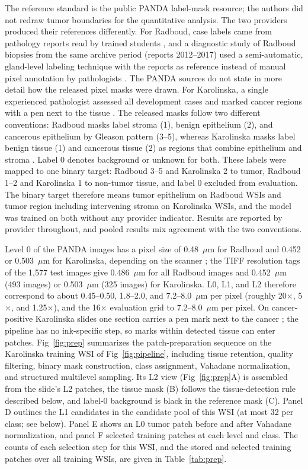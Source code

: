 \documentclass[10pt,letterpaper]{article}
\begin{document}
The reference standard is the public PANDA label-mask resource; the authors did not redraw tumor boundaries for the quantitative analysis. The two providers produced their references differently. For Radboud, case labels came from pathology reports read by trained students \cite{bibPANDAdesign}, and a diagnostic study of Radboud biopsies from the same archive period (reports 2012--2017) used a semi-automatic, gland-level labeling technique with the reports as reference instead of manual pixel annotation by pathologists \cite{bib10,bibBulten2019}. The PANDA sources do not state in more detail how the released pixel masks were drawn. For Karolinska, a single experienced pathologist assessed all development cases and marked cancer regions with a pen next to the tissue \cite{bibPANDAdesign}. The released masks follow two different conventions: Radboud masks label stroma (1), benign epithelium (2), and cancerous epithelium by Gleason pattern (3--5), whereas Karolinska masks label benign tissue (1) and cancerous tissue (2) as regions that combine epithelium and stroma \cite{bib11}. Label 0 denotes background or unknown for both. These labels were mapped to one binary target: Radboud 3--5 and Karolinska 2 to tumor, Radboud 1--2 and Karolinska 1 to non-tumor tissue, and label 0 excluded from evaluation. The binary target therefore means tumor epithelium on Radboud WSIs and tumor region including intervening stroma on Karolinska WSIs, and the model was trained on both without any provider indicator. Results are reported by provider throughout, and pooled results mix agreement with the two conventions.

Level 0 of the PANDA images has a pixel size of 0.48~$\mu$m for Radboud and 0.452 or 0.503~$\mu$m for Karolinska, depending on the scanner \cite{bibPANDAdesign}; the TIFF resolution tags of the 1,577 test images give 0.486~$\mu$m for all Radboud images and 0.452~$\mu$m (493 images) or 0.503~$\mu$m (325 images) for Karolinska. L0, L1, and L2 therefore correspond to about 0.45--0.50, 1.8--2.0, and 7.2--8.0~$\mu$m per pixel (roughly 20$\times$, 5$\times$, and 1.25$\times$), and the 16$\times$ evaluation grid to 7.2--8.0~$\mu$m per pixel. On cancer-positive Karolinska slides one section carries a pen mark next to the cancer \cite{bibPANDAdesign}; the pipeline has no ink-specific step, so marks within detected tissue can enter patches. Fig~\ref{fig:prep} summarizes the patch-preparation sequence on the Karolinska training WSI of Fig~\ref{fig:pipeline}, including tissue retention, quality filtering, binary mask construction, class assignment, Vahadane normalization, and structured multilevel sampling. Its L2 view (Fig~\ref{fig:prep}A) is assembled from the slide's L2 patches, the tissue mask (B) follows the tissue-detection rule described below, and label-0 background is black in the reference mask (C). Panel D outlines the L1 candidates in the candidate pool of this WSI (at most 32 per class; see below). Panel E shows an L0 tumor patch before and after Vahadane normalization, and panel F selected training patches at each level and class. The counts of each selection step for this WSI, and the stored and selected training patches over all training WSIs, are given in Table~\ref{tab:prep}.
\end{document}
